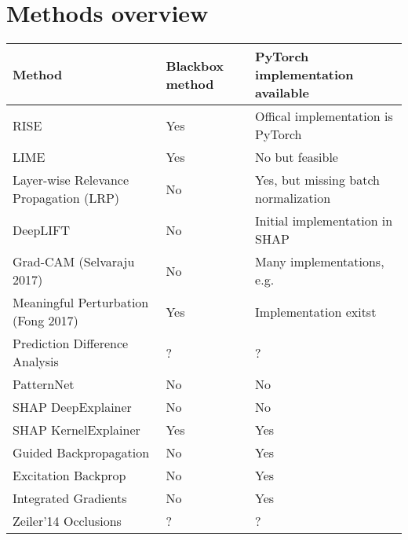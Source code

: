 \section{Methods overview}

\begin{tabular}{| p{7cm} | p{2.5cm} | p{6cm} | }
\hline
\textbf{Method} & \textbf{Blackbox method} & \textbf{PyTorch implementation available} \\ \hline

RISE\cite{Petsiuk2018rise} & Yes & Offical implementation is PyTorch \\ \hline
LIME\cite{ribeiro2016should} & Yes & No but feasible \\ \hline
Layer-wise Relevance Propagation (LRP) & No & Yes, but missing batch normalization\cite{lrppytorch} \\ \hline
DeepLIFT\cite{shrikumar2017learning} & No & Initial implementation in SHAP\cite{NIPS2017_7062} \\ \hline
Grad-CAM (Selvaraju 2017) & No & Many implementations, e.g. \cite{visualattribution} \\ \hline
Meaningful Perturbation (Fong 2017)\cite{fong2017interpretable} & Yes & Implementation exitst \cite{fong2017implementation} \\ \hline
Prediction Difference Analysis \cite{todo} & ? & ? \\ \hline
PatternNet & No & No \\ \hline
SHAP DeepExplainer\cite{NIPS2017_7062} & No & No \\ \hline
SHAP KernelExplainer\cite{NIPS2017_7062} & Yes & Yes \\ \hline
Guided Backpropagation  & No & Yes \cite{visualattribution} \\ \hline
Excitation Backprop \cite{zhang2016EB} & No & Yes \cite{visualattribution} \\ \hline
Integrated Gradients & No & Yes \cite{integratedgradientpytorch}  \\ \hline
Zeiler'14 Occlusions & ? & ? \\ \hline
\end{tabular}

